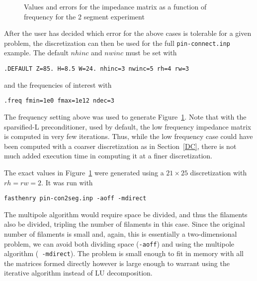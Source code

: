\begin{figure}
\begin{minipage}{0.49\textwidth}
\centerline{}
\centerline{}
\centerline{}
\centerline{}
\end{minipage}
\hfill
\begin{minipage}{0.49\textwidth}
\centerline{}
\centerline{}
\centerline{}
\centerline{}
\end{minipage}
\caption{Values and errors for the impedance matrix as a function of frequency 
for the 2 segment experiment}
\label{fig:twoseg}
\end{figure}

After the user has decided which error for the above cases is tolerable
for a given problem,
the discretization can then be used for the full {\tt pin-connect.inp}
example.  The default $nhinc$ and $nwinc$ must be set with
\begin{verbatim}
.DEFAULT Z=85. H=8.5 W=24. nhinc=3 nwinc=5 rh=4 rw=3
\end{verbatim}
and the frequencies of interest with
\begin{verbatim}
.freq fmin=1e0 fmax=1e12 ndec=3
\end{verbatim}

The frequency setting above was used to generate
Figure~\ref{fig:twoseg}.  Note that with the sparsified-L preconditioner,
used by default, the low frequency impedance matrix is
computed in very few iterations.  Thus, while the low frequency case
could have been computed with a coarser discretization as in
Section~\ref{DC}, there is not much added execution time in computing it 
at a finer discretization.

The exact values in Figure~\ref{fig:twoseg} were generated using a
$21 \times 25$ discretization with $rh = rw = 2$.  It was run with
\begin{verbatim}
fasthenry pin-con2seg.inp -aoff -mdirect
\end{verbatim}
The multipole algorithm would require space be divided, and thus the
filaments also be divided, tripling the number of filaments in this
case.  Since the original number of filaments is small and, again,
this is essentially a two-dimensional problem, we can avoid both
dividing space ({\tt -aoff}) and using the multipole algorithm ({\tt
-mdirect}). The problem is small enough to fit in memory with all the
matrices formed directly however is large enough to warrant using the
iterative algorithm instead of LU decomposition.

